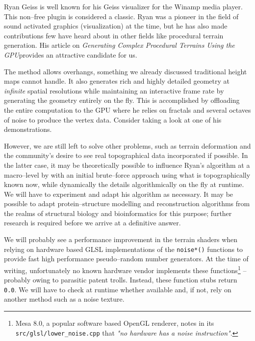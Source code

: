Ryan Geiss is well known for his Geiss visualizer for the Winamp media player. This non--free plugin is considered a classic. Ryan was a pioneer in the field of sound activated graphics (visualization) at the time, but he has also made contributions few have heard about in other fields like procedural terrain generation. His article on {\it Generating Complex Procedural Terrains Using the GPU} provides an attractive candidate for us.

The method allows overhangs, something we already discussed traditional height maps cannot handle. It also generates rich and highly detailed geometry at {\it infinite} spatial resolutions while maintaining an interactive frame rate by generating the geometry entirely on the fly. This is accomplished by offloading the entire computation to the GPU where he relies on fractals and several octaves of noise to produce the vertex data. Consider taking a look at one of his demonstrations.

However, we are still left to solve other problems, such as terrain deformation and the community's desire to see real topographical data incorporated if possible. In the latter case, it may be theoretically possible to influence Ryan's algorithm at a macro--level by  with an initial brute--force approach using what is topographically known now, while dynamically  the details algorithmically on the fly at runtime. We will have to experiment and adapt his algorithm as necessary. It may be possible to adapt protein--structure modelling and reconstruction algorithms from the realms of structural biology and bioinformatics for this purpose; further research is required before we arrive at a definitive answer.

We will probably see a performance improvement in the terrain shaders when relying on hardware based GLSL implementations of the {\tt noise*()} functions to provide fast high performance pseudo--random number generators. At the time of writing, unfortunately no known hardware vendor implements these functions\footnote{Mesa 8.0, a popular software based OpenGL renderer, notes in its {\tt src/glsl/lower_noise.cpp} that {\it "no hardware has a noise instruction"}.} -- probably owing to parasitic patent trolls. Instead, these function stubs return {\tt 0.0}. We will have to check at runtime whether available and, if not, rely on another method such as a noise texture.

